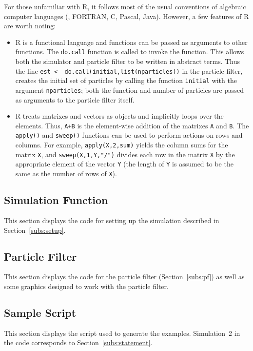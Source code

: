 \documentclass[12pt]{RR-article}
\newcommand\origbaselinestretch{1.5}
\begin{document}
For those unfamiliar with R, it follows most of the usual conventions
of algebraic computer languages (\eg, FORTRAN, C, Pascal, Java).
However, a few features of R are worth noting:
\begin{itemize}
\item R is a functional language and functions can be passed as
  arguments to other functions.  The \texttt{do.call} function is
  called to invoke the function.  This allows both the simulator and
  particle filter to be written in abstract terms.  Thus the line 
  \texttt{est <- do.call(initial,list(nparticles))} in the particle
  filter, creates the initial set of particles by calling the function
  \texttt{initial} with the argument \texttt{nparticles}; both the
  function and number of particles are passed as arguments to the
  particle filter itself.

\item R treats matrixes and vectors as objects and implicitly loops
  over the elements.  Thus, \texttt{A+B} is the element-wise addition
  of the matrixes \texttt{A} and \texttt{B}.  The \texttt{apply()} and
  \texttt{sweep()} functions can be used to perform actions on rows
  and columns.  For example, \texttt{apply(X,2,sum)} yields the column
  sums for the matrix \texttt{X}, and \texttt{sweep(X,1,Y,"/")}
  divides each row in the matrix \texttt{X} by the appropriate element
  of the vector \texttt{Y} (the length of \texttt{Y} is assumed to be
  the same as the number of rows of \texttt{X}).

\end{itemize}

\subsection{Simulation Function}
\label{subs:SimFun}

This section displays the code for setting up the simulation
described in Section~\ref{subs:setup}.


\renewcommand\baselinestretch{1.0}

\renewcommand\baselinestretch{\origbaselinestretch}

\subsection{Particle Filter}
\label{subs:PFCode}

This section displays the code for the particle filter
(Section~\ref{subs:pf}) as well as some graphics designed to work with
the particle filter.

\renewcommand\baselinestretch{1.0}

\renewcommand\baselinestretch{\origbaselinestretch}


\subsection{Sample Script}
\label{subs:Script}

This section displays the script used to generate the examples.
Simulation~2 in the code corresponds to Section~\ref{subs:statement}.


\renewcommand\baselinestretch{1.0}

\renewcommand\baselinestretch{\origbaselinestretch}
\end{document}

